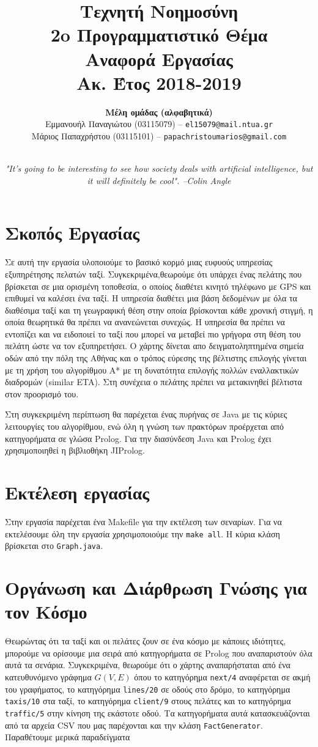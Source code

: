 \documentclass[a4paper,12pt]{article}
\title{ \textbf{Τεχνητή Νοημοσύνη}  \\ 2o Προγραμματιστικό Θέμα \\ Αναφορά Εργασίας \\ \small{Ακ. Έτος 2018-2019}}
\author{\textbf{Μέλη ομάδας (αλφαβητικά)} \\ Εμμανουήλ Παναγιώτου (03115079) -- \texttt{el15079@mail.ntua.gr} \\  Μάριος Παπαχρήστου (03115101) -- \texttt{papachristoumarios@gmail.com} \\ \noindent\rule{0.9\textwidth}{1pt}}
\date{\emph{"It's going to be interesting to see how society deals with artificial intelligence, but it will definitely be cool". --Colin Angle}}
\begin{document}
\maketitle

\section{Σκοπός Εργασίας} 

Σε αυτή την εργασία υλοποιούμε το βασικό κορμό μιας ευφυούς υπηρεσίας εξυπηρέτησης πελατών ταξί. Συγκεκριμένα,θεωρούμε ότι υπάρχει ένας πελάτης που βρίσκεται σε μια ορισμένη τοποθεσία, ο οποίος διαθέτει κινητό τηλέφωνο με GPS και επιθυμεί να καλέσει ένα ταξί. Η υπηρεσία διαθέτει μια βάση δεδομένων με όλα τα διαθέσιμα ταξί και τη γεωγραφική θέση στην
οποία βρίσκονται κάθε χρονική στιγμή, η οποία θεωρητικά θα πρέπει να ανανεώνεται συνεχώς. Η υπηρεσία θα πρέπει να εντοπίζει και να ειδοποιεί το ταξί που μπορεί να μεταβεί πιο γρήγορα στη θέση του πελάτη ώστε να τον εξυπηρετήσει. Ο χάρτης δίνεται απο δειγματοληπτημένα σημεία οδών από την πόλη της Αθήνας και ο τρόπος εύρεσης της βέλτιστης επιλογής γίνεται με τη χρήση του αλγορίθμου Α* με τη δυνατότητα επιλογής πολλών εναλλακτικών διαδρομών (similar ETA).  Στη συνέχεια ο πελάτης πρέπει να μετακινηθεί βέλτιστα στον προορισμό του.

Στη συγκεκριμένη περίπτωση θα παρέχεται ένας πυρήνας σε Java με τις κύριες λειτουργίες του αλγορίθμου, ενώ όλη η γνώση των πρακτόρων προέρχεται από κατηγορήματα σε γλώσα Prolog. Για την διασύνδεση Java και Prolog έχει χρησιμοποιηθεί η βιβλιοθήκη JIProlog. 

\section{Εκτέλεση εργασίας}

Στην εργασία παρέχεται ένα Makefile για την εκτέλεση των σεναρίων. Για να εκτελέσουμε όλη την εργασία χρησιμοποιούμε την \texttt{make all}. Η κύρια κλάση βρίσκεται στο \texttt{Graph.java}. 

\section{Οργάνωση και Διάρθρωση Γνώσης για τον Κόσμο} 

Θεωρώντας ότι τα ταξί και οι πελάτες ζουν σε ένα κόσμο με κάποιες ιδιότητες, μπορούμε να ορίσουμε μια σειρά από κατηγορήματα σε Prolog που αναπαριστούν όλα αυτά τα σενάρια. Συγκεκριμένα, θεωρούμε ότι ο χάρτης αναπαρήσταται από ένα κατευθυνόμενο γράφημα $G(V, E)$ όπου το κατηγόρημα \texttt{next/4} αναφέρεται σε ακμή του γραφήματος, το κατηγόρημα \texttt{lines/20} σε οδούς στο δρόμο, το κατηγόρημα \texttt{taxis/10} στα ταξί, το κατηγόρημα \texttt{client/9} στους πελάτες και το κατηγόρημα \texttt{traffic/5} στην κίνηση της εκάστοτε οδού. Τα κατηγορήματα αυτά κατασκευάζονται από τα αρχεία CSV που μας παρέχονται και την κλάση \texttt{FactGenerator}. Παραθέτουμε μερικά παραδείγματα
\end{document}
